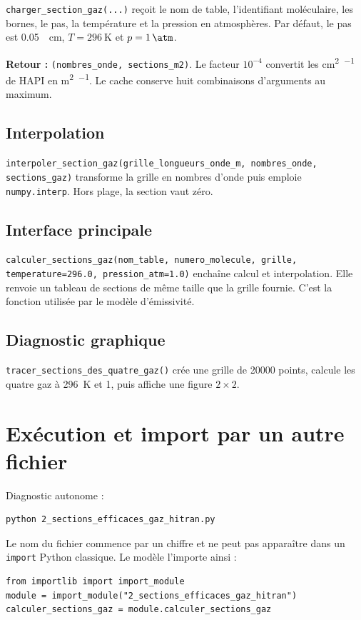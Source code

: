 \documentclass[11pt,a4paper]{article}
\begin{document}
\texttt{charger\_section\_gaz(...)} reçoit le nom de table, l'identifiant
moléculaire, les bornes, le pas, la température et la pression en atmosphères.
Par défaut, le pas est \SI{0.05}{\per\centi\metre},
$T=\SI{296}{\kelvin}$ et $p=\SI{1}{\atm}$.

\textbf{Retour :} \texttt{(nombres\_onde, sections\_m2)}. Le facteur $10^{-4}$
convertit les \si{\centi\metre\squared\per\molecule} de HAPI en
\si{\metre\squared\per\molecule}. Le cache conserve huit combinaisons
d'arguments au maximum.

\subsection{Interpolation}

\texttt{interpoler\_section\_gaz(grille\_longueurs\_onde\_m, nombres\_onde,
sections\_gaz)} transforme la grille en nombres d'onde puis emploie
\texttt{numpy.interp}. Hors plage, la section vaut zéro.

\subsection{Interface principale}

\texttt{calculer\_sections\_gaz(nom\_table, numero\_molecule, grille,
temperature=296.0, pression\_atm=1.0)} enchaîne calcul et interpolation. Elle
renvoie un tableau de sections de même taille que la grille fournie. C'est la
fonction utilisée par le modèle d'émissivité.

\subsection{Diagnostic graphique}

\texttt{tracer\_sections\_des\_quatre\_gaz()} crée une grille de 20000 points,
calcule les quatre gaz à \SI{296}{\kelvin} et \SI{1}{\atm}, puis affiche une
figure $2\times2$.

\section{Exécution et import par un autre fichier}

Diagnostic autonome :
\begin{lstlisting}[language=bash]
python 2_sections_efficaces_gaz_hitran.py
\end{lstlisting}

Le nom du fichier commence par un chiffre et ne peut pas apparaître dans un
\texttt{import} Python classique. Le modèle l'importe ainsi :
\begin{lstlisting}
from importlib import import_module
module = import_module("2_sections_efficaces_gaz_hitran")
calculer_sections_gaz = module.calculer_sections_gaz
\end{lstlisting}
\end{document}
